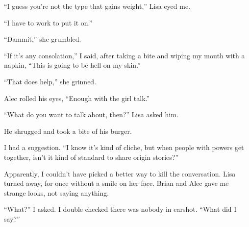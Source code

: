 ``I guess you're not the type that gains weight,'' Lisa eyed me.



``I have to work to put it on.''



``Dammit,'' she grumbled.



``If it's any consolation,'' I said, after taking a bite and wiping my mouth with a napkin, ``This is going to be hell on my skin.''



``That does help,'' she grinned.



Alec rolled his eyes, ``Enough with the girl talk.''



``What do you want to talk about, then?'' Lisa asked him.



He shrugged and took a bite of his burger.



I had a suggestion.  ``I know it's kind of cliche, but when people with powers get together, isn't it kind of standard to share origin stories?''



Apparently, I couldn't have picked a better way to kill the conversation.  Lisa turned away, for once without a smile on her face.  Brian and Alec gave me strange looks, not saying anything.



``What?'' I asked.  I double checked there was nobody in earshot.  ``What did I say?''


















